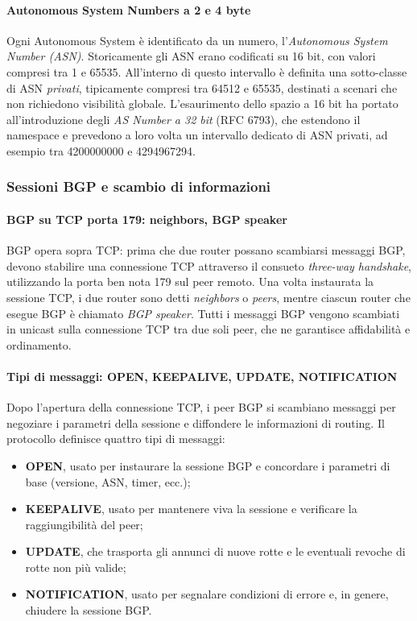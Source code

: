 \paragraph{Autonomous System Numbers a 2 e 4 byte}

Ogni Autonomous System è identificato da un numero, l’\emph{Autonomous System Number (ASN)}. Storicamente gli ASN erano codificati su 16 bit, con valori compresi tra 1 e 65535. All’interno di questo intervallo è definita una sotto-classe di ASN \emph{privati}, tipicamente compresi tra 64512 e 65535, destinati a scenari che non richiedono visibilità globale. L’esaurimento dello spazio a 16 bit ha portato all’introduzione degli \emph{AS Number a 32 bit} (RFC 6793), che estendono il namespace e prevedono a loro volta un intervallo dedicato di ASN privati, ad esempio tra 4200000000 e 4294967294.

\subsubsection{Sessioni BGP e scambio di informazioni}

\paragraph{BGP su TCP porta 179: neighbors, BGP speaker}

BGP opera sopra TCP: prima che due router possano scambiarsi messaggi BGP, devono stabilire una connessione TCP attraverso il consueto \emph{three-way handshake}, utilizzando la porta ben nota 179 sul peer remoto. Una volta instaurata la sessione TCP, i due router sono detti \emph{neighbors} o \emph{peers}, mentre ciascun router che esegue BGP è chiamato \emph{BGP speaker}. Tutti i messaggi BGP vengono scambiati in unicast sulla connessione TCP tra due soli peer, che ne garantisce affidabilità e ordinamento.

\paragraph{Tipi di messaggi: OPEN, KEEPALIVE, UPDATE, NOTIFICATION}

Dopo l’apertura della connessione TCP, i peer BGP si scambiano messaggi per negoziare i parametri della sessione e diffondere le informazioni di routing. Il protocollo definisce quattro tipi di messaggi:
\begin{itemize}
    \item \textbf{OPEN}, usato per instaurare la sessione BGP e concordare i parametri di base (versione, ASN, timer, ecc.);
    \item \textbf{KEEPALIVE}, usato per mantenere viva la sessione e verificare la raggiungibilità del peer;
    \item \textbf{UPDATE}, che trasporta gli annunci di nuove rotte e le eventuali revoche di rotte non più valide;
    \item \textbf{NOTIFICATION}, usato per segnalare condizioni di errore e, in genere, chiudere la sessione BGP.
\end{itemize}

